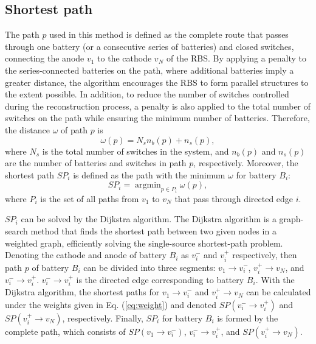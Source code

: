\documentclass{article}
\begin{document}
\subsection{Shortest path}

The path $p$ used in this method is defined as the complete route that passes through one battery (or a consecutive series of batteries) and closed switches, connecting the anode $v_1$ to the cathode $v_N$ of the RBS.
By applying a penalty to the series-connected batteries on the path, where additional batteries imply a greater distance, the algorithm encourages the RBS to form parallel structures to the extent possible.
In addition, to reduce the number of switches controlled during the reconstruction process, a penalty is also applied to the total number of switches on the path while ensuring the minimum number of batteries.
Therefore, the distance $\omega$ of path $p$ is  
\begin{equation}\label{eq:weight}
    \omega(p) = N_s  n_b (p) + n_s (p),
\end{equation}
where $N_s$ is the total number of switches in the system, 
and $n_b(p)$ and $n_s(p)$ are the number of batteries and switches in path $p$, respectively. 
Moreover, the shortest path $SP_i$ is defined as the path with the minimum $\omega$ for battery $B_i$:
\begin{equation}\label{eq:def_sp}
    SP_i = \mathop{\arg\min}_{p \in P_i} \omega(p),
\end{equation}
where $P_i$ is the set of all paths from $v_1$ to $v_N$ that pass through directed edge $i$.


$SP_i$ can be solved by the Dijkstra algorithm.
The Dijkstra algorithm is a graph-search method that finds the shortest path between two given nodes in a weighted graph, efficiently solving the single-source shortest-path problem.
Denoting the cathode and anode of battery $B_i$ as $v_i^-$ and $v_i^+$ respectively, then path $p$ of battery $B_i$  can be divided into three segments: $v_1 \rightarrow v_i^-$, $v_i^+ \rightarrow v_N$, and $v_i^- \rightarrow v_i^+$. $v_i^- \rightarrow v_i^+$ is the directed edge corresponding to battery $B_i$. 
With the Dijkstra algorithm, the shortest paths for $v_1 \rightarrow v_i^-$ and $v_i^+ \rightarrow v_N$ can be calculated under the weights given in Eq. (\ref{eq:weight}) and denoted $SP(v_i^- \rightarrow v_i^+)$ and $SP(v_i^+ \rightarrow v_N)$, respectively.
Finally, $SP_i$ for battery $B_i$ is formed by the complete path, which consists of $SP(v_1 \rightarrow v_i^-)$, $v_i^- \rightarrow v_i^+$, and $SP(v_i^+ \rightarrow v_N)$.
\end{document}
